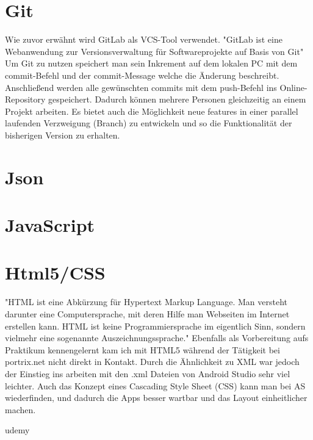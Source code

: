 \section{Git}
Wie zuvor erw\"ahnt wird GitLab als VCS-Tool verwendet. "GitLab ist eine Webanwendung zur Versionsverwaltung f\"ur Softwareprojekte auf Basis von Git"\footnotemark {} 
Um Git zu nutzen speichert man sein Inkrement auf dem lokalen PC mit dem commit-Befehl und der commit-Message welche die \"Anderung beschreibt. Anschlie\ss{}end werden alle gew\"unschten commits mit dem push-Befehl ins Online-Repository gespeichert. Dadurch k\"onnen mehrere Personen gleichzeitig an einem Projekt arbeiten. Es bietet auch die M\"oglichkeit neue features in einer parallel laufenden Verzweigung (Branch) zu entwickeln und so die Funktionalit\"at der bisherigen Version zu erhalten. 



\section{Json}
\section{JavaScript}
\section{Html5/CSS}
"HTML ist eine Abkürzung für Hypertext Markup Language. Man versteht darunter eine Computersprache, mit deren Hilfe man Webseiten im Internet erstellen kann. HTML ist keine Programmiersprache im eigentlich Sinn, sondern vielmehr eine sogenannte Auszeichnungssprache."\footnotemark
{} 
Ebenfalls als Vorbereitung aufs Praktikum kennengelernt kam ich mit HTML5 während der Tätigkeit bei portrix.net nicht direkt in Kontakt. Durch die \"Ahnlichkeit zu XML war jedoch der Einstieg ins arbeiten mit den .xml Dateien von Android Studio sehr viel leichter. Auch das Konzept eines Cascading Style Sheet (CSS) kann man bei AS wiederfinden, und dadurch die Apps besser wartbar und das Layout einheitlicher machen.




udemy

